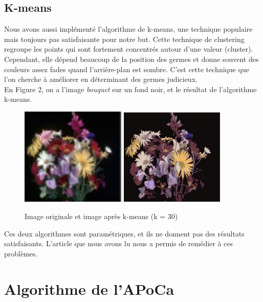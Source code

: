 \documentclass{article}
\begin{document}
\subsection{K-means}

Nous avons aussi implémenté l'algorithme de k-means, une technique populaire mais toujours pas satisfaisante pour notre but. Cette technique de clustering regroupe les points qui sont fortement concentrés autour d'une valeur (cluster). Cependant, elle dépend beaucoup de la position des germes et donne souvent des couleurs assez fades quand l'arrière-plan est sombre. C'est cette technique que l'on cherche à améliorer en déterminant des germes judicieux.\\

En Figure 2, on a l'image {\it bouquet} sur un fond noir, et le résultat de l'algorithme k-means.\\

\begin{figure}[h]
    \centering
     \includegraphics[width=5cm]{bouquet.pdf}
     \includegraphics[width=5cm]{bouquet_kmeans.pdf}
     \caption{Image originale et image après k-means (k = 30)}
\end{figure}

Ces deux algorithmes sont paramétriques, et ils ne donnent pas des résultats satisfaisants. L'article que nous avons lu nous a permis de remédier à ces problèmes.\\

\section{Algorithme de l'APoCa}
\end{document}
